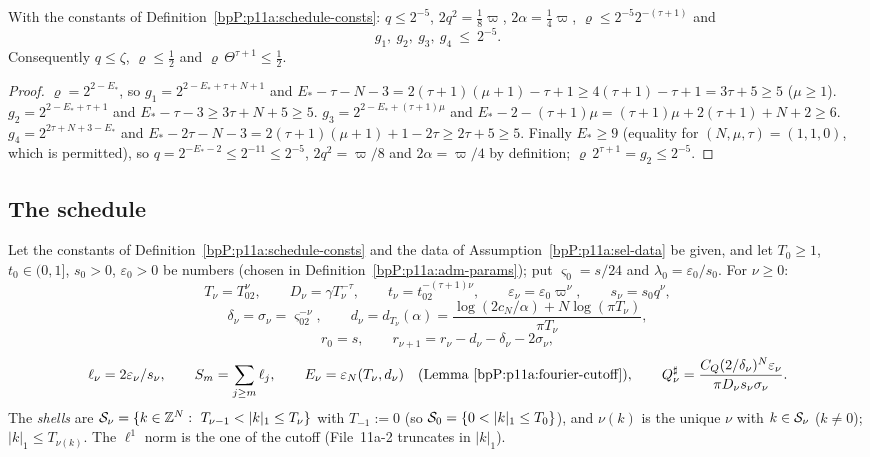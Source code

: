 \begin{lemma}\label{bpP:p11a:schedule-ratios}
With the constants of Definition~\ref{bpP:p11a:schedule-consts}: $q\le2^{-5}$, $2q^2=\frac18\varpi$, $2\alpha=\frac14\varpi$, $\varrho\le2^{-5}2^{-(\tau+1)}$ and
\[g_1,\ g_2,\ g_3,\ g_4\ \le\ 2^{-5}.\]
Consequently $q\le\zeta$, $\varrho\le\frac12$ and $\varrho\,\Theta^{\tau+1}\le\frac12$.
\end{lemma}
\begin{proof}
\label{stepP:p11a:sr-exp} $\varrho=2^{2-E_*}$, so $g_1=2^{2-E_*+\tau+N+1}$ and $E_*-\tau-N-3=2(\tau+1)(\mu+1)-\tau+1\ge4(\tau+1)-\tau+1=3\tau+5\ge5$ ($\mu\ge1$). $g_2=2^{2-E_*+\tau+1}$ and $E_*-\tau-3\ge3\tau+N+5\ge5$. $g_3=2^{2-E_*+(\tau+1)\mu}$ and $E_*-2-(\tau+1)\mu=(\tau+1)\mu+2(\tau+1)+N+2\ge6$. $g_4=2^{2\tau+N+3-E_*}$ and $E_*-2\tau-N-3=2(\tau+1)(\mu+1)+1-2\tau\ge2\tau+5\ge5$. Finally $E_*\ge9$ (equality for $(N,\mu,\tau)=(1,1,0)$, which is permitted), so $q=2^{-E_*-2}\le2^{-11}\le2^{-5}$, $2q^2=\varpi/8$ and $2\alpha=\varpi/4$ by definition; $\varrho\,2^{\tau+1}=g_2\le2^{-5}$.
\end{proof}

\subsection{The schedule}\label{bpP:p11a:sec-schedule}

\begin{definition}\label{bpP:p11a:schedule}
Let the constants of Definition~\ref{bpP:p11a:schedule-consts} and the data of Assumption~\ref{bpP:p11a:sel-data} be given, and let $T_0\ge1$, $t_0\in(0,1]$, $s_0>0$, $\varepsilon_0>0$ be numbers (chosen in Definition~\ref{bpP:p11a:adm-params}); put $\varsigma_0=s/24$ and $\lambda_0=\varepsilon_0/s_0$. For $\nu\ge0$:
\[T_\nu=T_02^\nu,\qquad D_\nu=\gamma T_\nu^{-\tau},\qquad t_\nu=t_02^{-(\tau+1)\nu},\qquad\varepsilon_\nu=\varepsilon_0\varpi^\nu,\qquad s_\nu=s_0q^\nu,\]
\[\delta_\nu=\sigma_\nu=\varsigma_02^{-\nu},\qquad d_\nu=d_{T_\nu}(\alpha)=\frac{\log(2c_N/\alpha)+N\log(\pi T_\nu)}{\pi T_\nu},\]
\[r_0=s,\qquad r_{\nu+1}=r_\nu-d_\nu-\delta_\nu-2\sigma_\nu,\]
\[\ell_\nu=2\varepsilon_\nu/s_\nu,\qquad S_m=\sum_{j\ge m}\ell_j,\qquad E_\nu=\varepsilon_N(T_\nu,d_\nu)\quad(\text{Lemma~\ref{bpP:p11a:fourier-cutoff}}),\qquad Q_\nu^\sharp=\frac{C_Q(2/\delta_\nu)^N\varepsilon_\nu}{\pi D_\nu s_\nu\sigma_\nu}.\]
The \emph{shells} are $\mathcal S_\nu=\{k\in\mathbb{Z}^N:\ T_{\nu-1}<\lvert k\rvert_1\le T_\nu\}$ with $T_{-1}:=0$ (so $\mathcal S_0=\{0<\lvert k\rvert_1\le T_0\}$), and $\nu(k)$ is the unique $\nu$ with $k\in\mathcal S_\nu$ ($k\ne0$); $\lvert k\rvert_1\le T_{\nu(k)}$. The $\ell^1$ norm is the one of the cutoff (File~11a-2 truncates in $\lvert k\rvert_1$).
\end{definition}

